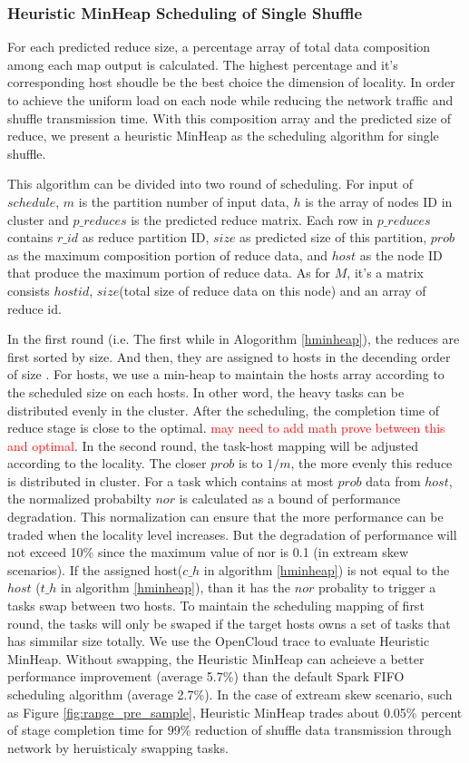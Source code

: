 \documentclass[10pt,twocolumn]{article}
\begin{document}
\subsubsection{Heuristic MinHeap Scheduling of Single Shuffle}\label{h-minheap}
For each predicted reduce size, a percentage array of total data composition among each map output is calculated. The highest percentage and it's corresponding host shoudle be the best choice the dimension of locality. In order to achieve the uniform load on each node while reducing the network traffic and shuffle transmission time. With this composition array and the predicted size of reduce, we present a heuristic MinHeap as the scheduling algorithm for single shuffle.

This algorithm can be divided into two round of scheduling. For input of $schedule$, $m$ is the partition number of input data, $h$ is the array of nodes ID in cluster and $p\_reduces$ is the predicted reduce matrix. Each row in $p\_reduces$ contains $r\_id$ as reduce partition ID, $size$ as predicted size of this partition, $prob$ as the maximum composition portion of reduce data, and $host$ as the node ID that produce the maximum portion of reduce data. As for $M$, it's a matrix consists $hostid$, $size$(total size of reduce data on this node) and an array of reduce id. 

In the first round (i.e. The first while in Alogorithm \ref{hminheap}), the reduces are first sorted by size. And then, they are assigned to hosts in the decending order of size . For hosts, we use a min-heap to maintain the hosts array according to the scheduled size on each hosts. In other word, the heavy tasks can be distributed evenly in the cluster.  After the scheduling, the completion time of reduce stage is close to the optimal. \textcolor{red}{may need to add math prove between this and optimal}. In the second round, the task-host mapping will be adjusted according to the locality. The closer $prob$ is to $1/m$, the more evenly this reduce is distributed in cluster. For a task which contains at most $prob$ data from $host$, the normalized probabilty $nor$ is calculated as a bound of performance degradation. This normalization can ensure that the more performance can be traded when the locality level increases. But the degradation of performance will not exceed 10\% since the maximum value of nor is 0.1 (in extream skew scenarios).  If the assigned host($c\_h$ in algorithm \ref{hminheap}) is not equal to the $host$ ($t\_h$ in algorithm \ref{hminheap}), than it has the $nor$ probality to trigger a tasks swap between two hosts. To maintain the scheduling mapping of first round, the tasks will only be swaped if the target hosts owns a set of tasks that has simmilar size totally. We use the OpenCloud\cite{opencloudtrace} trace to evaluate Heuristic MinHeap. Without swapping, the Heuristic MinHeap can acheieve a better performance improvement (average 5.7\%) than the default Spark FIFO scheduling algorithm (average 2.7\%). In the case of extream skew scenario, such as Figure \ref{fig:range_pre_sample}, Heuristic MinHeap trades about 0.05\% percent of stage completion time for 99\% reduction of shuffle data transmission through network by heruisticaly swapping tasks.
\end{document}
